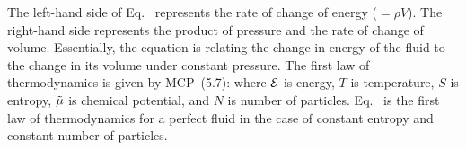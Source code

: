 {	The left-hand side of Eq.~ represents the rate of change of energy ($ =\rho V$).  The right-hand side represents the product of pressure and the rate of change of volume.  Essentially, the equation is relating the change in energy of the fluid to the change in its volume under constant pressure.  The first law of thermodynamics is given by MCP~(5.7):
	where $\mathcal{E}$ is energy, $T$ is temperature, $S$ is entropy, $\tilde{\mu}$ is chemical potential, and $N$ is number of particles.  Eq.~ is the first law of thermodynamics for a perfect fluid in the case of constant entropy and constant number of particles.
}




